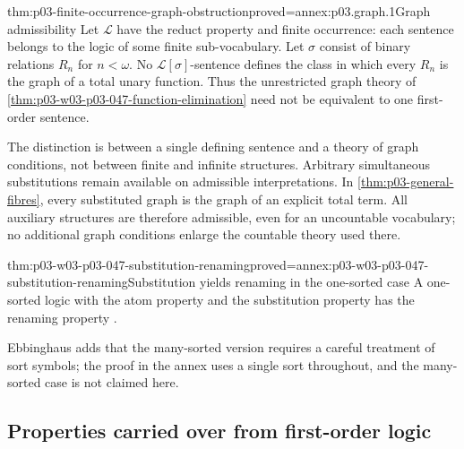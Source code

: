 \begin{hbtheorem}{thm:p03-finite-occurrence-graph-obstruction}{proved=annex:p03.graph.1}{Graph admissibility}
Let \(\mathscr L\) have the reduct property and finite occurrence:
each sentence belongs to the logic of some finite sub-vocabulary.
Let \(\sigma\) consist of binary relations \(R_n\) for \(n<\omega\).
No \(\mathscr L[\sigma]\)-sentence defines the class in which every
\(R_n\) is the graph of a total unary function.
Thus the unrestricted graph theory of
\cref{thm:p03-w03-p03-047-function-elimination} need not be equivalent
to one first-order sentence.
\end{hbtheorem}

The distinction is between a single defining sentence and a theory of
graph conditions, not between finite and infinite structures. Arbitrary
simultaneous substitutions remain available on admissible interpretations.
In \cref{thm:p03-general-fibres}, every substituted graph is the graph
of an explicit total term. All auxiliary structures are therefore
admissible, even for an uncountable vocabulary; no additional graph
conditions enlarge the countable theory used there.

\begin{hbtheorem}{thm:p03-w03-p03-047-substitution-renaming}{proved=annex:p03-w03-p03-047-substitution-renaming}{Substitution yields renaming in the one-sorted case}
A one-sorted logic with the atom property and the substitution property has
the renaming property \cite[Ch.~II, \S1.2, p.~31]{Ebbinghaus1985ExtendedLogics}.
\end{hbtheorem}

Ebbinghaus adds that the many-sorted version requires a careful treatment of
sort symbols; the proof in the annex uses a single sort throughout, and the
many-sorted case is not claimed here.

\subsection{Properties carried over from first-order logic}

